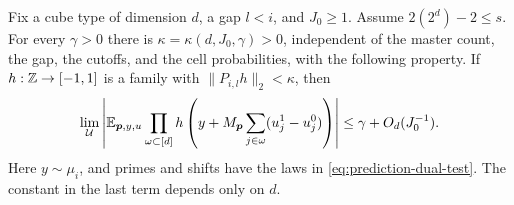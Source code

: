 \begin{lemma}
\label{lem:subgroup-inverse}
Fix a cube type of dimension $d$, a gap $l<i$, and $J_0\geq1$.
Assume $2(2^d)-2\leq s$.  For every $\gamma>0$ there is
$\kappa=\kappa(d,J_0,\gamma)>0$, independent of the master count,
the gap, the cutoffs, and the cell probabilities, with the following
property.  If $h:\mathbb Z\to[-1,1]$ is a family with
$\|P_{i,l}h\|_2<\kappa$, then
\begin{equation}\label{eq:prediction-subgroup-conclusion}
 \lim_{\mathcal U}\left|
 \mathbb E_{\boldsymbol p,y,u}
 \prod_{\omega\subset[d]}
 h\left(y+M_{\boldsymbol p}
       \sum_{j\in\omega}(u_j^1-u_j^0)\right)\right|
 \leq\gamma+O_d(J_0^{-1}).
\end{equation}
Here $y\sim\mu_i$, and primes and shifts have the laws in
\eqref{eq:prediction-dual-test}.  The constant in the last term
depends only on $d$.
\end{lemma}

